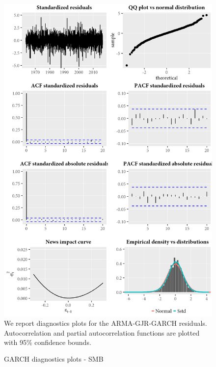 \begin{figure}[H]
  \caption{GARCH diagnostics plots - SMB}
  \label{diag:garchdiagSMB}
  \centering
  \begin{minipage}{\textwidth}
  \includegraphics[scale=1]{graphics/garch/garch_diagnosticsSMB.png}  
  \vspace{3mm}
  \footnotesize
  We report diagnostics plots for the ARMA-GJR-GARCH residuals. Autocorrelation and partial autocorrelation functions are plotted with 95\% confidence bounds.
  \end{minipage}
\end{figure}
